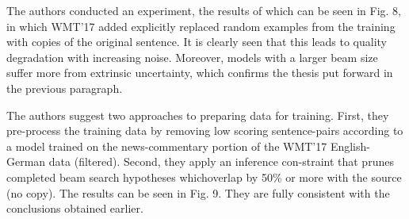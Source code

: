\documentclass[a4paper,14pt]{extarticle}
\begin{document}
	\begin{figure}[t]
	\end{figure}
	
	The authors conducted an experiment, the results of which can be seen in Fig. 8, in which WMT'17 added explicitly replaced random examples from the training with copies of the original sentence. It is clearly seen that this leads to quality degradation with increasing noise. Moreover, models with a larger beam size suffer more from extrinsic uncertainty, which confirms the thesis put forward in the previous paragraph.
	
	\begin{figure}[t]
	\end{figure}
	
	The authors suggest two approaches to preparing data for training. First, they pre-process the training data by removing low scoring sentence-pairs according to a model trained on the news-commentary portion of the WMT’17 English-German data (filtered). Second, they apply an inference con-straint that prunes completed beam search hypotheses whichoverlap by 50\% or more with the source (no copy). The results can be seen in Fig. 9. They are fully consistent with the conclusions obtained earlier.
	
\end{document}
